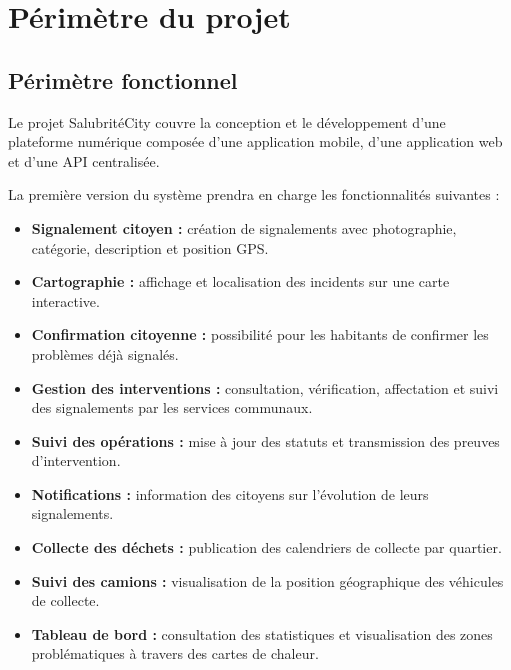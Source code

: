 \documentclass[11pt,a4paper,oneside]{report}
\begin{document}
	
	
	\section{Périmètre du projet}
	
	\subsection{Périmètre fonctionnel}
	
	Le projet SalubritéCity couvre la conception et le
	développement d'une plateforme numérique composée
	d'une application mobile, d'une application web et
	d'une API centralisée.
	
	La première version du système prendra en charge
	les fonctionnalités suivantes :
	
	\begin{itemize}
		\item \textbf{Signalement citoyen :} création de
		signalements avec photographie, catégorie,
		description et position GPS.
		
		\item \textbf{Cartographie :} affichage et localisation
		des incidents sur une carte interactive.
		
		\item \textbf{Confirmation citoyenne :} possibilité
		pour les habitants de confirmer les problèmes
		déjà signalés.
		
		\item \textbf{Gestion des interventions :} consultation,
		vérification, affectation et suivi des signalements
		par les services communaux.
		
		\item \textbf{Suivi des opérations :} mise à jour
		des statuts et transmission des preuves
		d'intervention.
		
		\item \textbf{Notifications :} information des citoyens
		sur l'évolution de leurs signalements.
		
		\item \textbf{Collecte des déchets :} publication
		des calendriers de collecte par quartier.
		
		\item \textbf{Suivi des camions :} visualisation
		de la position géographique des véhicules
		de collecte.
		
		\item \textbf{Tableau de bord :} consultation
		des statistiques et visualisation des zones
		problématiques à travers des cartes de chaleur.
	\end{itemize}
	
\end{document}
